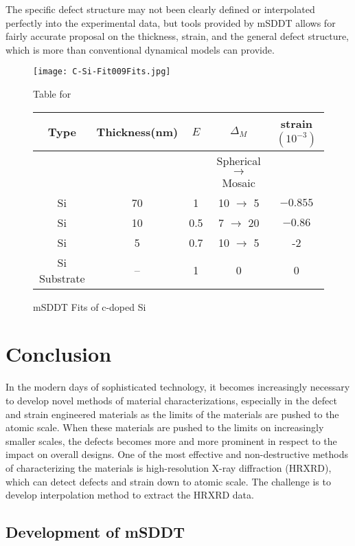 The specific defect structure may not been clearly defined or interpolated perfectly into the experimental data, but tools provided by mSDDT allows for fairly accurate proposal on the thickness, strain, and the general defect structure, which is more than conventional dynamical models can provide.


\begin{figure}[h]
\caption{mSDDT Fits of c-doped Si}
\label{C-SiFits}
\texttt{[image: C-Si-Fit009Fits.jpg]}
\begin{minipage}{\linewidth}
\centering
\vspace{10pt}
Table for \\
\begin{tabular}[htbp]{@{}c|cccc@{}}
    \hline
  Type & Thickness(nm) & $E$ & $\Delta_M$ & strain $(10^{-3})$ \\
    \hline
	&			&  & Spherical $\rightarrow$ Mosaic & \\
\hline
  Si 	&	70	& 	1	 &	10 $\rightarrow$ 5	& $-0.855$  \\
  Si & 	10	& 	0.5	&	7  $\rightarrow$ 20 & $-0.86$  \\
Si	& 	5 	& 	0.7	&	10 $\rightarrow$ 5 &-2\\
  Si Substrate & -- & 1 & 0 & 0 
  \end{tabular}
\end{minipage}
\end{figure}


\chapter{Conclusion}

In the modern days of sophisticated technology,  it becomes increasingly necessary to develop novel methods of material characterizations, especially in the defect and strain engineered materials as the limits of the materials are pushed to the atomic scale.  When these materials are pushed to the limits on increasingly smaller scales, the defects becomes more and more prominent in respect to the impact on overall designs.  One of the most effective and non-destructive methods of characterizing the materials is high-resolution X-ray diffraction (HRXRD), which can detect defects and strain down to atomic scale.  The challenge is to develop interpolation method to extract the HRXRD data.

\section{Development of mSDDT}

